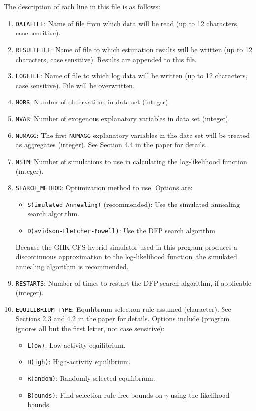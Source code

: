 \documentclass{article}
\begin{document}
The description of each line in this file is as follows:
\begin{enumerate}
\item {\tt DATAFILE}: Name of file from which data will be read (up to 12 characters, case sensitive).
\item {\tt RESULTFILE}: Name of file to which estimation results will be written (up to 12 characters, case sensitive).  Results are appended to this file.
\item {\tt LOGFILE}: Name of file to which log data will be written (up to 12 characters, case sensitive).
	File will be overwritten.
\item {\tt NOBS}: Number of observations in data set (integer).
\item {\tt NVAR}: Number of exogenous explanatory variables in data set (integer).
\item {\tt NUMAGG}: The first {\tt NUMAGG} explanatory variables in the data set will be treated as aggregates (integer).  See Section 4.4 in the paper for details.
\item {\tt NSIM}: Number of simulations to use in calculating the log-likelihood function (integer).
\item {\tt SEARCH\_METHOD}: Optimization method to use.  Options are:
	\begin{itemize}
		\item {\tt S(imulated Annealing)} (recommended): Use the simulated annealing search algorithm.
		\item {\tt D(avidson-Fletcher-Powell)}: Use the DFP search algorithm
	\end{itemize}
	Because the GHK-CFS hybrid simulator used in this program produces a discontinuous approximation
	to the log-likelihood function, the simulated annealing algorithm is recommended.
\item {\tt RESTARTS}: Number of times to restart the DFP search algorithm, if applicable (integer).  
\item {\tt EQUILIBRIUM\_{}TYPE}: Equilibrium selection rule assumed (character). 
	See Sections 2.3 and 4.2 in the paper for details.   Options include (program ignores all but 
	the first letter, not case sensitive):
	\begin{itemize}
		\item {\tt L(ow)}: Low-activity equilibrium.
		\item {\tt H(igh)}: High-activity equilibrium.
		\item {\tt R(andom)}: Randomly selected equilibrium.
		\item {\tt B(ounds)}: Find selection-rule-free bounds on $\gamma$ using the likelihood bounds

\end{itemize}
\end{enumerate}
\end{document}
